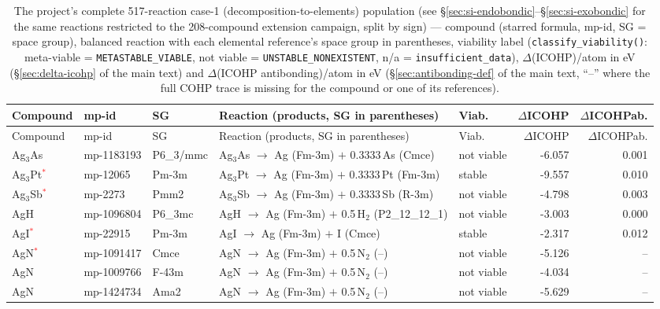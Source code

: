 \begin{longtable}{@{}ll l@{\hspace{4pt}} p{4.6cm} l@{\hspace{4pt}} rr@{}}
\caption{The project's complete 517-reaction case-1 (decomposition-to-elements) population (see \S\ref{sec:si-endobondic}--\S\ref{sec:si-exobondic} for the same reactions restricted to the 208-compound extension campaign, split by sign) --- compound (starred formula, mp-id, SG = space group), balanced reaction with each elemental reference's space group in parentheses, viability label (\texttt{classify\_viability()}: meta-viable = \texttt{METASTABLE\_VIABLE}, not viable = \texttt{UNSTABLE\_NONEXISTENT}, n/a = \texttt{insufficient\_data}), $\Delta$(ICOHP)/atom in eV (\S\ref{sec:delta-icohp} of the main text) and $\Delta$(ICOHP antibonding)/atom in eV (\S\ref{sec:antibonding-def} of the main text, ``--'' where the full COHP trace is missing for the compound or one of its references).}\\
\toprule
Compound & mp-id & SG & Reaction (products, SG in parentheses) & Viab. & $\Delta$ICOHP & $\Delta$ICOHP\-ab. \\
\midrule
\endfirsthead
\toprule
Compound & mp-id & SG & Reaction (products, SG in parentheses) & Viab. & $\Delta$ICOHP & $\Delta$ICOHP\-ab. \\
\midrule
\endhead
\bottomrule
\endfoot
\bottomrule
\endlastfoot
Ag$_{3}$As & mp-1183193 & P6\_3/mmc & Ag$_{3}$As $\to$ Ag (Fm-3m) $+$ 0.3333\,As (Cmce) & not viable & -6.057 & 0.001 \\
Ag$_{3}$Pt\textcolor{red}{$^*$} & mp-12065 & Pm-3m & Ag$_{3}$Pt $\to$ Ag (Fm-3m) $+$ 0.3333\,Pt (Fm-3m) & stable & -9.557 & 0.010 \\
Ag$_{3}$Sb\textcolor{red}{$^*$} & mp-2273 & Pmm2 & Ag$_{3}$Sb $\to$ Ag (Fm-3m) $+$ 0.3333\,Sb (R-3m) & not viable & -4.798 & 0.003 \\
AgH & mp-1096804 & P6\_3mc & AgH $\to$ Ag (Fm-3m) $+$ 0.5\,H$_{2}$ (P2\_12\_12\_1) & not viable & -3.003 & 0.000 \\
AgI\textcolor{red}{$^*$} & mp-22915 & Pm-3m & AgI $\to$ Ag (Fm-3m) $+$ I (Cmce) & stable & -2.317 & 0.012 \\
AgN\textcolor{red}{$^*$} & mp-1091417 & Cmce & AgN $\to$ Ag (Fm-3m) $+$ 0.5\,N$_{2}$ (--) & not viable & -5.126 & -- \\
AgN & mp-1009766 & F-43m & AgN $\to$ Ag (Fm-3m) $+$ 0.5\,N$_{2}$ (--) & not viable & -4.034 & -- \\
AgN & mp-1424734 & Ama2 & AgN $\to$ Ag (Fm-3m) $+$ 0.5\,N$_{2}$ (--) & not viable & -5.629 & -- \\

\end{longtable}
